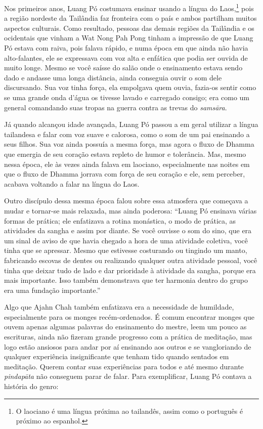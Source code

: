 Nos primeiros anos, Luang Pó costumava ensinar usando a língua do
Laos,\footnote{O laociano é uma língua próxima ao tailandês, assim como o
  português é próximo ao espanhol.} pois a região nordeste da Tailândia
faz fronteira com o país e ambos partilham muitos aspectos culturais.
Como resultado, pessoas das demais regiões da Tailândia e os ocidentais
que vinham a Wat Nong Pah Pong tinham a impressão de que Luang Pó estava
com raiva, pois falava rápido, e numa época em que ainda não havia
alto-falantes, ele se expressava com voz alta e enfática que podia ser
ouvida de muito longe. Mesmo se você saísse do salão onde o ensinamento
estava sendo dado e andasse uma longa distância, ainda conseguia ouvir o
som dele discursando. Sua voz tinha força, ela empolgava quem ouvia,
fazia-os sentir como se uma grande onda d'água os tivesse lavado e
carregado consigo; era como um general comandando suas tropas na guerra
contra as trevas do \emph{samsāra}.

Já quando alcançou idade avançada, Luang Pó passou a em geral utilizar a
língua tailandesa e falar com voz suave e calorosa, como o som de um pai
ensinando a seus filhos. Sua voz ainda possuía a mesma força, mas agora
o fluxo de Dhamma que emergia de seu coração estava repleto de humor e
tolerância. Mas, mesmo nessa época, ele às vezes ainda falava em
laociano, especialmente nas noites em que o fluxo de Dhamma jorrava com
força de seu coração e ele, sem perceber, acabava voltando a falar na
língua do Laos.

Outro discípulo dessa mesma época falou sobre essa atmosfera que
começava a mudar e tornar-se mais relaxada, mas ainda poderosa: ``Luang
Pó ensinava várias formas de prática; ele enfatizava a rotina monástica,
o modo de prática, as atividades da sangha e assim por diante. Se você
ouvisse o som do sino, que era um sinal de aviso de que havia chegado a
hora de uma atividade coletiva, você tinha que se apressar. Mesmo que
estivesse costurando ou tingindo um manto, fabricando escovas de dentes
ou realizando qualquer outra atividade pessoal, você tinha que deixar
tudo de lado e dar prioridade à atividade da sangha, porque era mais
importante. Isso também demonstrava que ter harmonia dentro do grupo era
uma fundação importante.''

Algo que Ajahn Chah também enfatizava era a necessidade de humildade,
especialmente para os monges recém-ordenados. É comum encontrar monges
que ouvem apenas algumas palavras do ensinamento do mestre, leem um
pouco as escrituras, ainda não fizeram grande progresso com a prática de
meditação, mas logo estão ansiosos para andar por aí ensinando aos
outros e se vangloriando de qualquer experiência insignificante que
tenham tido quando sentados em meditação. Querem contar suas
experiências para todos e até mesmo durante \emph{pindapāta} não
conseguem parar de falar. Para exemplificar, Luang Pó contava a história
do genro:

